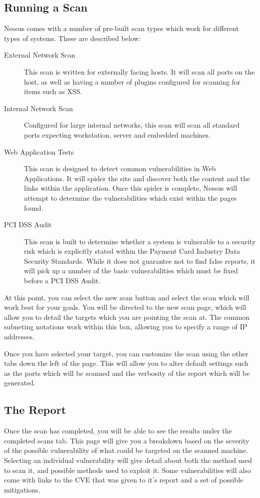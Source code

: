\documentclass[a4paper,11pt]{report}
\begin{document}
		\subsection{Running a Scan}
			Nessus comes with a number of pre-built scan types which work for different types of systems. 
			These are described below:
			\begin{description}
				\item[External Network Scan] This scan is written for externally facing hosts. 
					It will scan all ports on the host, as well as having a number of plugins configured for scanning for items such as XSS. 
				\item[Internal Network Scan]
					Configured for large internal networks, this scan will scan all standard ports expecting workstation, server and embedded machines. 
				\item[Web Application Tests]
					This scan is designed to detect common vulnerabilities in Web Applications. 
					It will spider the site and discover both the content and the links within the application. 
					Once this spider is complete, Nessus will attempt to determine the vulnerabilities which exist within the pages found. 
				\item[PCI DSS Audit]
					This scan is built to determine whether a system is vulnerable to a security risk which is explicitly stated within the Payment Card Industry Data Security Standards. 
					While it does not guarantee not to find false reports, it will pick up a number of the basic vulnerabilities which must be fixed before a PCI DSS Audit. 
			\end{description}
			At this point, you can select the new scan button and select the scan which will work best for your goals. 
			You will be directed to the new scan page, which will allow you to detail the targets which you are pointing the scan at. 
			The common subneting notations work within this box, allowing you to specify a range of IP addresses. 

			Once you have selected your target, you can customize the scan using the other tabs down the left of the page. 
			This will allow you to alter default settings such as the ports which will be scanned and the verbosity of the report which will be generated. 
		\subsection{The Report}
			Once the scan has completed, you will be able to see the results under the completed scans tab. 
			This page will give you a breakdown based on the severity of the possible vulnerability of what could be targeted on the scanned machine. 
			Selecting an individual vulnerability will give detail about both the method used to scan it, and possible methods used to exploit it. 
			Some vulnerabilities will also come with links to the CVE that was given to it's report and a set of possible mitigations. 
\end{document}
